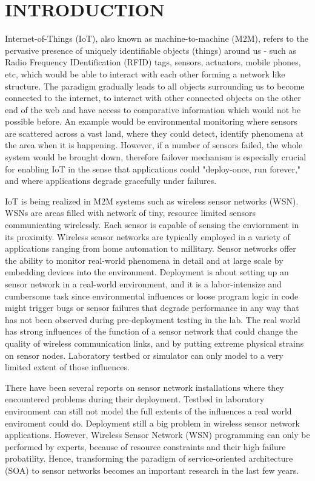 \cleardoublepage
\singlespacing
\chapter{INTRODUCTION}
\label{c:intro}
\doublespacing\nointerlineskip

Internet-of-Things (IoT), also known as machine-to-machine (M2M), refers to the
pervasive presence of uniquely identifiable objects (things) around us - such as
Radio Frequency IDentification (RFID) tags, sensors,
actuators, mobile phones, etc, which would be able to interact with each
other forming a network like structure. 
The paradigm gradually leads to all objects surrounding us to become connected
to the internet, to interact with other connected objects on the other end of
the web and have access to comparative information which would not be possible
before.
An example would be environmental monitoring where sensors are scattered across
a vast land, where they could detect, identify phenomena at the area when it is
happening. However, if a number of sensors failed, the whole system would be
brought down, therefore failover mechanism is especially crucial for enabling
IoT in the sense that applications could "deploy-once, run forever," and where
applications degrade gracefully under failures.

IoT is being realized in M2M systems such as wireless sensor networks (WSN).
WSNs are areas filled with network of tiny, resource limited sensors
communicating wirelessly. Each sensor is capable of sensing the enviornment in
its proximity. Wireless sensor networks are typically employed in a variety of
applications ranging from home automation to millitary.
Sensor networks offer the ability to monitor real-world phenomena in detail and
at large scale by embedding devices into the environment. Deployment is
about setting up an sensor network in a real-world environment, and it is
a labor-intensize and cumbersome task since environmental influences or
loose program logic in code might trigger bugs or sensor failures that
degrade performance in any way that has not been observed during pre-deployment
testing in the lab.
The real world has strong influences of the function of a sensor network that
could change the quality of wireless communication links, and by putting
extreme physical strains on sensor nodes. Laboratory testbed or simulator can 
only model to a very limited extent of those influences.

There have been several reports on sensor network installations where they
encountered problems during their
deployment\cite{Barrenetxea2008,Polastre2004,Arora2004,Tateson2005,Padhy2005,Stoianov2007,Tolle2005,Werner-Allen2006a}.
Testbed in laboratory environment can still not model the full extents of the
influences a real world enviroment could do. Deployment still a big problem in
wireless sensor network applications.
However, Wireless Sensor Network (WSN) programming can only be performed by
experts, because of resource constraints and their high failure probatility.
Hence, transforming the paradigm of service-oriented architecture (SOA) to
sensor networks becomes an important research in the last few
years.~\cite{Koutsoukos2007,Hughes2012}

